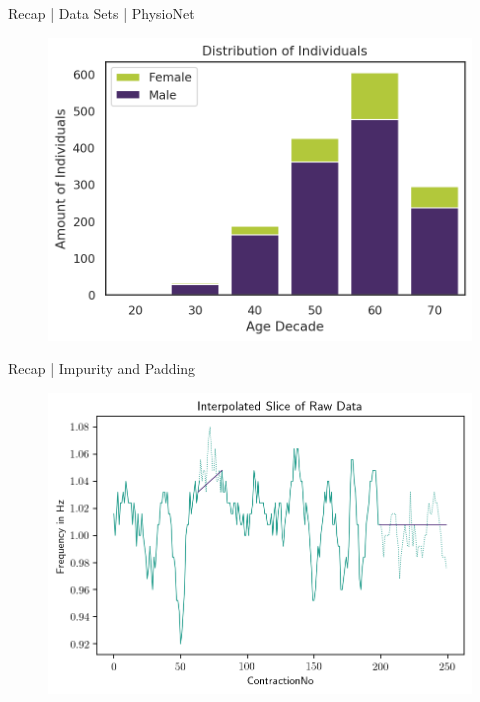 \documentclass{beamer}
\begin{document}
    \begin{frame}{Recap | Data Sets | PhysioNet}
        \begin{figure}[hbt]
        	\center
        	\includegraphics[width=1.0\textwidth]{img/physionet-distribution-subjects.png}
        	\label{fig:dist_physionet}
        \end{figure}
    \end{frame}
    
    \begin{frame}{Recap | Impurity and Padding}
        \begin{figure}[hbt]
        	\center
        	\includegraphics[width=1.0\textwidth]{img/slice_raw_data_linear_spline_interpolation.png}
        	\label{fig:interpolation_and_padding}
        \end{figure}
    \end{frame}
    
\end{document}
